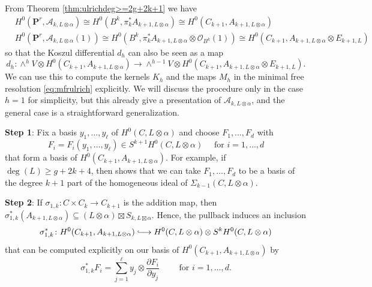 \documentclass[12pt]{amsart}
\numberwithin{equation}{section}
\numberwithin{thmcounter}{section}
\theoremstyle{definition}
\theoremstyle{claim}
\newcommand{\nP}{\mathbf{P}}
\newcommand{\sO}{\mathscr{O}}
\newcommand*{\longhookrightarrow}{\ensuremath{\lhook\joinrel\relbar\joinrel\rightarrow}}
\begin{document}
\noindent
From Theorem \ref{thm:ulrichdeg>=2g+2k+1} we have
\begin{align*}
	&H^0(\nP^r,\mathscr{A}_{k,L\otimes \alpha})  \cong H^0(B^k,\pi_k^*A_{k+1,L\otimes \alpha}) \cong H^0(C_{k+1},A_{k+1,L\otimes \alpha}) \\
	&H^0(\nP^r,\mathscr{A}_{k,L\otimes \alpha}(1))  \cong  H^0(B^k,\pi_k^*A_{k+1,L\otimes \alpha} \otimes \sO_{B^k}(1)) \cong H^0(C_{k+1},A_{k+1,L\otimes \alpha} \otimes E_{k+1,L})
\end{align*}
so that the  Koszul differential $d_h$ can also be seen as a map
\begin{equation}\label{eq:firstkoszul}
	d_h\colon  \wedge^h V\otimes H^0(C_{k+1},A_{k+1,L\otimes \alpha}) \longrightarrow \wedge^{h-1}V\otimes H^0(C_{k+1},A_{k+1,L\otimes \alpha} \otimes E_{k+1,L}).
\end{equation}
We can use this to compute the kernels $K_h$ and the maps $M_h$ in the minimal free resolution \ref{eq:mfrulrich} explicitly. We will discuss the procedure only in the case $h=1$ for simplicity, but this already give a presentation of $\mathscr{A}_{k,L\otimes \alpha}$, and the general case is a straightforward generalization.
\medskip


\noindent
\textbf{Step 1}: Fix a basis $y_1,\dots,y_\ell$ of $H^0(C,L\otimes \alpha)$ and choose $F_1,\dots,F_d$ with
\[ F_i = F_i(y_1,\dots,y_{\ell}) \in S^{k+1}H^0(C,L\otimes \alpha) \quad \text{ for } i=1,\dots,d \]
that form a basis of $H^0(C_{k+1},A_{k+1,L\otimes \alpha})$. For example, if $\deg(L)\geq g+2k+4$, then \cite[Theorem 5.2]{ENP} shows that we can take $F_1,\dots,F_d$ to be a basis of the degree $k+1$ part of the homogeneous ideal of $\Sigma_{k-1}(C,L\otimes \alpha)$.
\medskip



\noindent
\textbf{Step 2}: If $\sigma_{1,k}\colon C \times C_k \to C_{k+1}$ is the addition map, then $\sigma_{1,k}^*(A_{k+1,L\otimes \alpha}) \subseteq (L\otimes \alpha) \boxtimes S_{k,L\boxtimes \alpha}$. Hence, the pullback induces an inclusion
\begin{align*}
	\sigma_{1,k}^*\colon H^0(C_{k+1},A_{k+1,L\otimes \alpha}) \longhookrightarrow  H^0(C,L\otimes \alpha) \otimes S^k H^0(C,L\otimes \alpha)
\end{align*}
that can be computed explicitly on our basis of $H^0(C_{k+1},A_{k+1,L\otimes \alpha})$ by
\[ \sigma_{1,k}^*F_i = \sum_{j=1}^{\ell} y_j \otimes \frac{\partial F_i}{\partial y_j} \qquad \text{ for } i=1,\dots,d. \]
\end{document}

